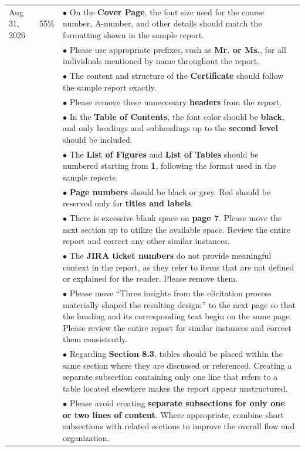 \documentclass[12pt,oneside,letterpaper]{article}
\begin{document}
{\begin{longtable}{@{\hspace{\tabcolsep}}p{}p{}p{}@{\hspace{\tabcolsep}}}
Aug 31, 2026 & 55\% & $\bullet$ On the \textbf{Cover Page}, the font size used for the course number, A-number, and other details should match the formatting shown in the sample report. \\
 & & $\bullet$ Please use appropriate prefixes, such as \textbf{Mr. or Ms.}, for all individuals mentioned by name throughout the report. \\
 & & $\bullet$ The content and structure of the \textbf{Certificate} should follow the sample report exactly. \\
 & & $\bullet$ Please remove these unnecessary \textbf{headers} from the report. \\
 & & $\bullet$ In the \textbf{Table of Contents}, the font color should be \textbf{black}, and only headings and subheadings up to the \textbf{second level} should be included. \\
 & & $\bullet$ The \textbf{List of Figures} and \textbf{List of Tables} should be numbered starting from \textbf{1}, following the format used in the sample reports. \\
 & & $\bullet$ \textbf{Page numbers} should be black or grey. Red should be reserved only for \textbf{titles and labels}. \\
 & & $\bullet$ There is excessive blank space on \textbf{page 7}. Please move the next section up to utilize the available space. Review the entire report and correct any other similar instances. \\
 & & $\bullet$ The \textbf{JIRA ticket numbers} do not provide meaningful context in the report, as they refer to items that are not defined or explained for the reader. Please remove them. \\
 & & $\bullet$ Please move ``Three insights from the elicitation process materially shaped the resulting design:'' to the next page so that the heading and its corresponding text begin on the same page. Please review the entire report for similar instances and correct them consistently. \\
 & & $\bullet$ Regarding \textbf{Section 8.3}, tables should be placed within the same section where they are discussed or referenced. Creating a separate subsection containing only one line that refers to a table located elsewhere makes the report appear unstructured. \\
 & & $\bullet$ Please avoid creating \textbf{separate subsections for only one or two lines of content}. Where appropriate, combine short subsections with related sections to improve the overall flow and organization. \\

\end{longtable}}
\end{document}
